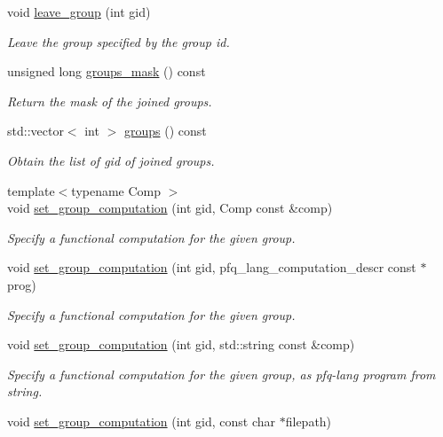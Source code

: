 \begin{DoxyCompactItemize}
void \hyperlink{classpfq_1_1socket_ac512d6b89db52da73a51ba9112658180}{leave\+\_\+group} (int gid)
\begin{DoxyCompactList}\small\item\em Leave the group specified by the group id. \end{DoxyCompactList}\item 
unsigned long \hyperlink{classpfq_1_1socket_a45c12f4255af4eb74bb9a75d8e1a56eb}{groups\+\_\+mask} () const 
\begin{DoxyCompactList}\small\item\em Return the mask of the joined groups. \end{DoxyCompactList}\item 
std\+::vector$<$ int $>$ \hyperlink{classpfq_1_1socket_a7bb02f670cf9c16b4339f650c7b80de7}{groups} () const 
\begin{DoxyCompactList}\small\item\em Obtain the list of gid of joined groups. \end{DoxyCompactList}\item 
{\footnotesize template$<$typename Comp $>$ }\\void \hyperlink{classpfq_1_1socket_a5cb37765ffcb1b78c5d61211f9e806df}{set\+\_\+group\+\_\+computation} (int gid, Comp const \&comp)
\begin{DoxyCompactList}\small\item\em Specify a functional computation for the given group. \end{DoxyCompactList}\item 
void \hyperlink{classpfq_1_1socket_a5f0ff8e78f374974ae32753c313e931c}{set\+\_\+group\+\_\+computation} (int gid, pfq\+\_\+lang\+\_\+computation\+\_\+descr const $\ast$prog)
\begin{DoxyCompactList}\small\item\em Specify a functional computation for the given group. \end{DoxyCompactList}\item 
void \hyperlink{classpfq_1_1socket_aa326867f9a3ca1391158161ff54d564c}{set\+\_\+group\+\_\+computation} (int gid, std\+::string const \&comp)
\begin{DoxyCompactList}\small\item\em Specify a functional computation for the given group, as pfq-\/lang program from string. \end{DoxyCompactList}\item 
void \hyperlink{classpfq_1_1socket_acb1eaaaadbcbbee8b5f2054b01e51fda}{set\+\_\+group\+\_\+computation} (int gid, const char $\ast$filepath)

\end{DoxyCompactItemize}
